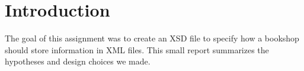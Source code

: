 \section{Introduction}

The goal of this assignment was to create an XSD file to specify how a bookshop
should store information in XML files. This small report summarizes the
hypotheses and design choices we made.
